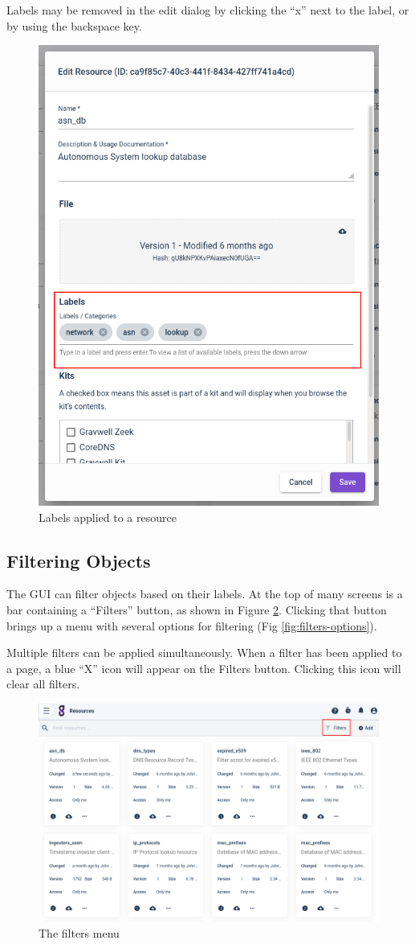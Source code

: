 Labels may be removed in the edit dialog by clicking the ``x'' next to the label, or by using the backspace key.

\begin{figure}
	\includegraphics[width=0.5\linewidth]{images/resource-labels.png}
	\caption{Labels applied to a resource}
	\label{fig:resource-labels}
\end{figure}

\subsection{Filtering Objects}

The GUI can filter objects based on their labels. At the top of many screens is a bar containing a ``Filters'' button, as shown in Figure \ref{fig:filters-menu}. Clicking that button brings up a menu with several options for filtering (Fig \ref{fig:filters-options}).

Multiple filters can be applied simultaneously. When a filter has been applied to a page, a blue ``X'' icon will appear on the Filters button. Clicking this icon will clear all filters.

\begin{figure}
	\includegraphics[width=0.7\linewidth]{images/filters-menu.png}
	\caption{The filters menu}
	\label{fig:filters-menu}
\end{figure}

